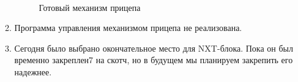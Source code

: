 \begin{enumerate}
\begin{enumerate}
		\begin{figure}[H]
			\begin{minipage}[h]{0.47\linewidth}
			\end{minipage}
			\begin{minipage}[h]{0.47\linewidth}
			\end{minipage}
			\caption{Готовый механизм прицепа}
		\end{figure}
		
		\item Программа управления механизмом прицепа не реализована.
		
		\item Сегодня было выбрано окончательное место для NXT-блока. Пока он был временно закреплен7 на скотч, но в будущем мы планируем закрепить его надежнее.
		

\end{enumerate}
\end{enumerate}
